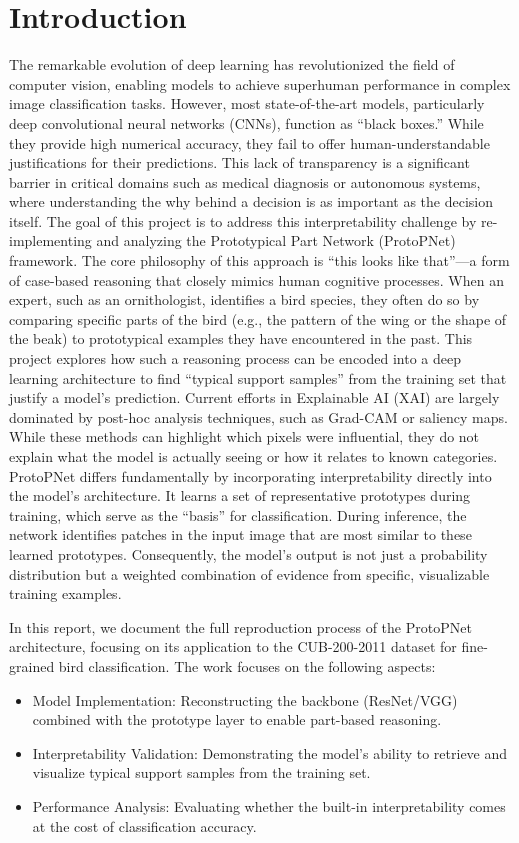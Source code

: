 \documentclass[conference]{IEEEtran}
\begin{document}
\section{Introduction}
\label{sec:introduction} 
The remarkable evolution of deep learning has revolutionized the field of computer vision, enabling models to achieve superhuman performance in complex image classification tasks. However, most state-of-the-art models, particularly deep convolutional neural networks (CNNs), function as ``black boxes.'' While they provide high numerical accuracy, they fail to offer human-understandable justifications for their predictions. This lack of transparency is a significant barrier in critical domains such as medical diagnosis \cite{b1} or autonomous systems, where understanding the why behind a decision is as important as the decision itself.
The goal of this project is to address this interpretability challenge by re-implementing and analyzing the Prototypical Part Network (ProtoPNet) framework. The core philosophy of this approach is ``this looks like that''—a form of case-based reasoning that closely mimics human cognitive processes. When an expert, such as an ornithologist, identifies a bird species, they often do so by comparing specific parts of the bird (e.g., the pattern of the wing or the shape of the beak) to prototypical examples they have encountered in the past. This project explores how such a reasoning process can be encoded into a deep learning architecture to find ``typical support samples'' from the training set that justify a model's prediction.
Current efforts in Explainable AI (XAI) are largely dominated by post-hoc analysis techniques, such as Grad-CAM or saliency maps. While these methods can highlight which pixels were influential, they do not explain what the model is actually seeing or how it relates to known categories. ProtoPNet differs fundamentally by incorporating interpretability directly into the model's architecture. It learns a set of representative prototypes during training, which serve as the ``basis'' for classification. During inference, the network identifies patches in the input image that are most similar to these learned prototypes. Consequently, the model's output is not just a probability distribution but a weighted combination of evidence from specific, visualizable training examples.


In this report, we document the full reproduction process of the ProtoPNet architecture, focusing on its application to the CUB-200-2011 dataset for fine-grained bird classification. The work focuses on the following aspects:
\begin{itemize}
\item Model Implementation: Reconstructing the backbone (ResNet/VGG) combined with the prototype layer to enable part-based reasoning.
\item Interpretability Validation: Demonstrating the model's ability to retrieve and visualize typical support samples from the training set.
\item Performance Analysis: Evaluating whether the built-in interpretability comes at the cost of classification accuracy.
\end{itemize}
\end{document}
